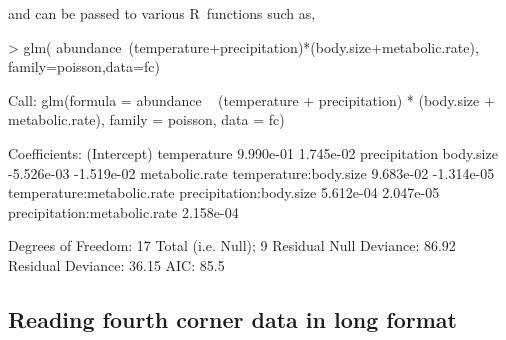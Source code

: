\documentclass{article}
\newcommand{\R}{{\sf R}}
\numberwithin{exercise}{section}
\begin{document}
and can be passed to various \R\ functions such as,
\begin{Schunk}
\begin{Sinput}
> glm(
   abundance~(temperature+precipitation)*(body.size+metabolic.rate),
   family=poisson,data=fc)
\end{Sinput}
\begin{Soutput}
Call:  glm(formula = abundance ~ (temperature + precipitation) * (body.size + 
    metabolic.rate), family = poisson, data = fc)

Coefficients:
                 (Intercept)                   temperature  
                   9.990e-01                     1.745e-02  
               precipitation                     body.size  
                  -5.526e-03                    -1.519e-02  
              metabolic.rate         temperature:body.size  
                   9.683e-02                    -1.314e-05  
  temperature:metabolic.rate       precipitation:body.size  
                   5.612e-04                     2.047e-05  
precipitation:metabolic.rate  
                   2.158e-04  

Degrees of Freedom: 17 Total (i.e. Null);  9 Residual
Null Deviance:	    86.92 
Residual Deviance: 36.15 	AIC: 85.5 
\end{Soutput}
\end{Schunk}

\subsection{Reading fourth corner data in long format}
\end{document}

